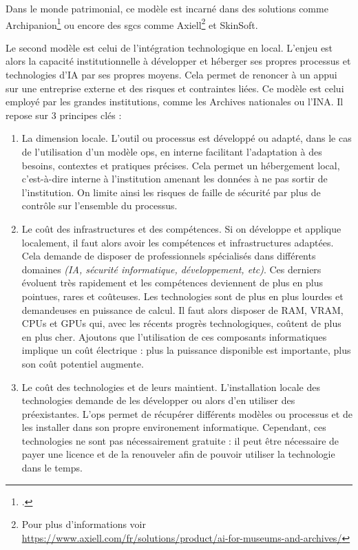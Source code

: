 Dans le monde patrimonial, ce modèle est incarné dans des solutions comme Archipanion\footcite{ArchipanionPourCineJournal} ou encore des \glspl{sgc} comme Axiell\footnote{Pour plus d'informations voir \url{https://www.axiell.com/fr/solutions/product/ai-for-museums-and-archives/}} et SkinSoft. \newline
 
Le second modèle est celui de l'intégration technologique en local. L'enjeu est alors la capacité institutionnelle à développer et héberger ses propres processus et technologies d'\gls{IA} par ses propres moyens. Cela permet de renoncer à un appui sur une entreprise externe et des risques et contraintes liées. Ce modèle est celui employé par les grandes institutions, comme les Archives nationales ou l'INA. Il repose sur 3 principes clés : 
 
 \begin{enumerate}
 	\item La dimension locale. L'outil ou processus est développé ou adapté, dans le cas de l'utilisation d'un modèle \gls{ops}, en interne facilitant l'adaptation à des besoins, contextes et pratiques précises. Cela permet un hébergement local, c'est-à-dire interne à l'institution amenant les données à ne pas sortir de l'institution. On limite ainsi les risques de faille de sécurité par plus de contrôle sur l'ensemble du processus. 
 	
 	\item Le coût des infrastructures et des compétences. Si on développe et applique localement, il faut alors avoir les compétences et infrastructures adaptées. Cela demande de disposer de professionnels spécialisés dans différents domaines \textit{(\gls{IA}, sécurité informatique, développement, etc)}. Ces derniers évoluent très rapidement et les compétences deviennent de plus en plus pointues, rares et coûteuses. Les technologies sont de plus en plus lourdes et demandeuses en puissance de calcul. Il faut alors disposer de \gls{RAM}, \gls{VRAM}, \glspl{CPU} et \glspl{GPU} qui, avec les récents progrès technologiques, coûtent de plus en plus cher. Ajoutons que l'utilisation de ces composants informatiques implique un coût électrique : plus la puissance disponible est importante, plus son coût potentiel augmente.
 	
 	\item Le coût des technologies et de leurs maintient. L'installation locale des technologies demande de les développer ou alors d'en utiliser des préexistantes. L'\gls{ops} permet de récupérer différents modèles ou processus et de les installer dans son propre environement informatique. Cependant, ces technologies ne sont pas nécessairement gratuite : il peut être nécessaire de payer une licence et de la renouveler afin de pouvoir utiliser la technologie dans le temps.
 \end{enumerate}
 
